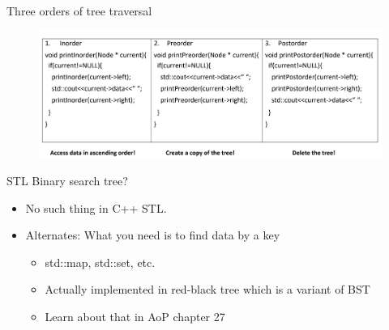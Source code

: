 \documentclass[aspectratio=169]{beamer}
\begin{document}
\begin{frame}{Three orders of tree traversal}
        \begin{figure}
            \includegraphics[width=\textwidth]{BST_traverse.png}
    \end{figure}
\end{frame}


\begin{frame}{STL Binary search tree?}

\begin{itemize}
    \item No such thing in C++ STL.
    \item Alternates: What you need is to find  data by a key
        \begin{itemize}
            \item std::map, std::set, etc.
            \item Actually implemented in red-black tree which is a variant of BST
            \item Learn about that in AoP chapter 27
        \end{itemize}
\end{itemize}
    
\end{frame}
\end{document}
